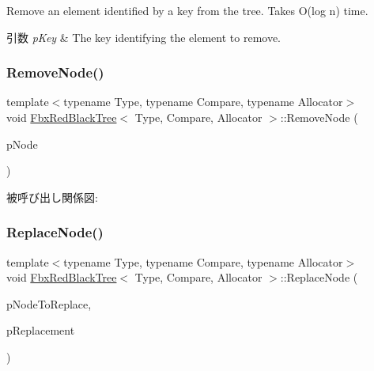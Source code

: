 Remove an element identified by a key from the tree. Takes O(log n) time. 
\begin{DoxyParams}{引数}
{\em p\+Key} & The key identifying the element to remove. \\
\hline
\end{DoxyParams}
\mbox{\label{class_fbx_red_black_tree_af0e3ffcca91f083d958bec08fbd20100}} 
\subsubsection{\texorpdfstring{Remove\+Node()}{RemoveNode()}}
{\footnotesize\ttfamily template$<$typename Type, typename Compare, typename Allocator$>$ \\
void \hyperlink{class_fbx_red_black_tree}{Fbx\+Red\+Black\+Tree}$<$ Type, Compare, Allocator $>$\+::Remove\+Node (\begin{DoxyParamCaption}\item[{\hyperlink{class_fbx_red_black_tree_1_1_record_type}{Record\+Type} $\ast$}]{p\+Node }\end{DoxyParamCaption})\hspace{0.3cm}{\ttfamily [protected]}}

被呼び出し関係図\+:
\mbox{\label{class_fbx_red_black_tree_a80886c4cbd8f7a9f492f9b52effbdfa9}} 
\subsubsection{\texorpdfstring{Replace\+Node()}{ReplaceNode()}}
{\footnotesize\ttfamily template$<$typename Type, typename Compare, typename Allocator$>$ \\
void \hyperlink{class_fbx_red_black_tree}{Fbx\+Red\+Black\+Tree}$<$ Type, Compare, Allocator $>$\+::Replace\+Node (\begin{DoxyParamCaption}\item[{\hyperlink{class_fbx_red_black_tree_1_1_record_type}{Record\+Type} $\ast$}]{p\+Node\+To\+Replace,  }\item[{\hyperlink{class_fbx_red_black_tree_1_1_record_type}{Record\+Type} $\ast$}]{p\+Replacement }\end{DoxyParamCaption})\hspace{0.3cm}{\ttfamily [protected]}}

